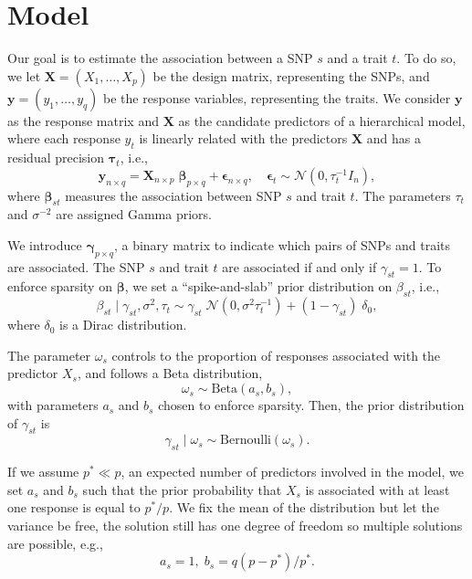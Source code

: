 \documentclass[a4paper, 11pt]{report}
\numberwithin{equation}{chapter}
\begin{document}
\newpage
\chapter{Model}
Our goal is to estimate the association between a SNP $s$ and a trait $t$. To do so, we let $\boldsymbol{X }= (X_1,\ldots,X_p)$ be the design matrix, representing the SNPs, and $\boldsymbol{y} = (y_1,\ldots,y_q)$ be the response variables, representing the traits. We consider $\boldsymbol{y}$ as the response matrix and $\boldsymbol{X}$ as the candidate predictors of a hierarchical model, where each response $y_t$ is linearly related with the predictors $\boldsymbol{X}$ and has a residual precision $\boldsymbol{\tau}_t$, i.e.,
\begin{equation*}
\label{eq:model}
\boldsymbol{y}_{n\times q} = \boldsymbol{X}_{n \times p}\;\boldsymbol{\beta}_{p \times q}+\boldsymbol{\epsilon}_{n \times q},\quad\boldsymbol{\epsilon}_t \sim \mathcal{N}(0,\tau_t^{-1}I_n),
\end{equation*}
where $\boldsymbol{\beta}_{st}$ measures the association between SNP $s$ and trait $t$. The parameters $\tau_t$ and $\sigma^{-2}$ are assigned Gamma priors.

We introduce $\boldsymbol{\gamma}_{p\times q}$, a binary matrix to indicate which pairs of SNPs and traits are associated. The SNP $s$ and trait $t$ are associated if and only if $\gamma_{st} = 1$. To enforce sparsity on $\boldsymbol{\beta}$, we set a ``spike-and-slab'' prior distribution on $\beta_{st}$, i.e.,
\begin{equation*}
\beta_{st} \mid \gamma_{st},\sigma^2, \tau_t \sim \gamma_{st}\;\mathcal{N}(0,\sigma^2\tau_t^{-1})+(1-\gamma_{st})\;\delta_0,
\end{equation*}
where $\delta_0$ is a Dirac distribution.

The parameter $\omega_s$ controls to the proportion of responses associated with the predictor $X_s$, and follows a Beta distribution,
\begin{equation*}
\omega_s \sim \text{Beta}(a_s, b_s),
\end{equation*}
with parameters $a_s$ and $b_s$ chosen to enforce sparsity. Then, the prior distribution of $\gamma_{st}$ is
\begin{equation*}
\gamma_{st} \mid \omega_s \sim  \text{Bernoulli}(\omega_s).
\end{equation*}

If we assume $p^* \ll p$, an expected number of predictors involved in the model, we set $a_s$ and $b_s$ such that the prior probability that $X_s$ is associated with at least one response is equal to $p^*/p$. We fix the mean of the distribution but let the variance be free, the solution still has one degree of freedom so multiple solutions are possible, e.g.,
\begin{equation*}
a_s = 1,\;b_s = q(p-p^*)/p^*.
\end{equation*}
\end{document}
